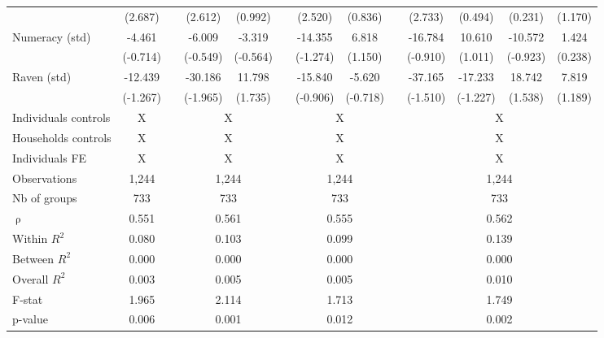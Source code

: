 \begin{table}[htbp]
{\begin{tabular}{lcccccccccccc}
      & (2.687) &   & (2.612) & (0.992) &   & (2.520) & (0.836) &   & (2.733) & (0.494) & (0.231) & (1.170) \\
    Numeracy (std) & -4.461 &   & -6.009 & -3.319 &   & -14.355 & 6.818 &   & -16.784 & 10.610 & -10.572 & 1.424 \\
      & (-0.714) &   & (-0.549) & (-0.564) &   & (-1.274) & (1.150) &   & (-0.910) & (1.011) & (-0.923) & (0.238) \\
    Raven (std) & -12.439 &   & -30.186 & 11.798 &   & -15.840 & -5.620 &   & -37.165 & -17.233 & 18.742 & 7.819 \\
      & (-1.267) &   & (-1.965) & (1.735) &   & (-0.906) & (-0.718) &   & (-1.510) & (-1.227) & (1.538) & (1.189) \\
\cmidrule{1-2}\cmidrule{4-5}\cmidrule{7-8}\cmidrule{10-13}  
	Individuals controls & X     &       & \multicolumn{2}{c}{X} &       & \multicolumn{2}{c}{X} &       & \multicolumn{4}{c}{X} \\
    Households controls & X     &       & \multicolumn{2}{c}{X} &       & \multicolumn{2}{c}{X} &       & \multicolumn{4}{c}{X} \\
    Individuals FE & X     &       & \multicolumn{2}{c}{X} &       & \multicolumn{2}{c}{X} &       & \multicolumn{4}{c}{X} \\
    \midrule
    Observations & 1,244  &       & \multicolumn{2}{c}{1,244} &       & \multicolumn{2}{c}{1,244} &       & \multicolumn{4}{c}{1,244} \\
    Nb of groups & 733   &       & \multicolumn{2}{c}{733} &       & \multicolumn{2}{c}{733} &       & \multicolumn{4}{c}{733} \\
    $\uprho$ & 0.551 &       & \multicolumn{2}{c}{0.561} &       & \multicolumn{2}{c}{0.555} &       & \multicolumn{4}{c}{0.562} \\
    Within $R^2$ & 0.080 &       & \multicolumn{2}{c}{0.103} &       & \multicolumn{2}{c}{0.099} &       & \multicolumn{4}{c}{0.139} \\
    Between $R^2$ & 0.000 &       & \multicolumn{2}{c}{0.000} &       & \multicolumn{2}{c}{0.000} &       & \multicolumn{4}{c}{0.000} \\
    Overall $R^2$ & 0.003 &       & \multicolumn{2}{c}{0.005} &       & \multicolumn{2}{c}{0.005} &       & \multicolumn{4}{c}{0.010} \\
    F-stat & 1.965 &       & \multicolumn{2}{c}{2.114} &       & \multicolumn{2}{c}{1.713} &       & \multicolumn{4}{c}{1.749} \\
    p-value & 0.006 &       & \multicolumn{2}{c}{0.001} &       & \multicolumn{2}{c}{0.012} &       & \multicolumn{4}{c}{0.002} \\

\end{tabular}}
\end{table}
